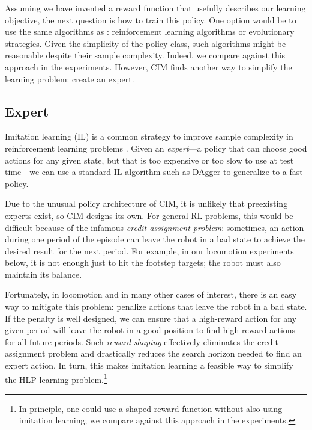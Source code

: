 \documentclass[a4paper]{article}
\begin{document}
Assuming we have invented a reward function that usefully describes our learning objective, the next question is how to train this policy.
One option would be to use the same algorithms as \citet{iscen2018pmtg}: reinforcement learning algorithms or evolutionary strategies.
Given the simplicity of the policy class, such algorithms might be reasonable despite their sample complexity.
Indeed, we compare against this approach in the experiments.
However, CIM finds another way to simplify the learning problem: create an expert.

\subsection{Expert} \label{sec:expert}

Imitation learning (IL) is a common strategy to improve sample complexity in reinforcement learning problems \citep{osa2018algorithmic}.
Given an \emph{expert}---a policy that can choose good actions for any given state, but that is too expensive or too slow to use at test time---we can use
a standard IL algorithm such as DAgger \citep{ross2011reduction} to generalize to a fast policy.

Due to the unusual policy architecture of CIM, it is unlikely that preexisting experts exist,
so CIM designs its own.
For general RL problems, this would be difficult because of the infamous \emph{credit assignment problem}:
sometimes, an action during one period of the episode can leave the robot in a bad state to achieve the desired result for the next period.
For example, in our locomotion experiments below, it is not enough just to hit the footstep targets; the robot must also maintain its balance.

Fortunately, in locomotion and in many other cases of interest, there is an easy way to mitigate this problem: penalize actions that leave the robot in a bad state.
If the penalty is well designed, we can ensure that a high-reward action for any given period will leave the robot in a good position to find high-reward actions for all future periods.
Such \emph{reward shaping} effectively eliminates the credit assignment problem and drastically reduces the search horizon needed to find an expert action.
In turn, this makes imitation learning a feasible way to simplify the HLP learning problem.\footnote{
In principle, one could use a shaped reward function without also using imitation learning; we compare against this approach in the experiments.}
\end{document}
